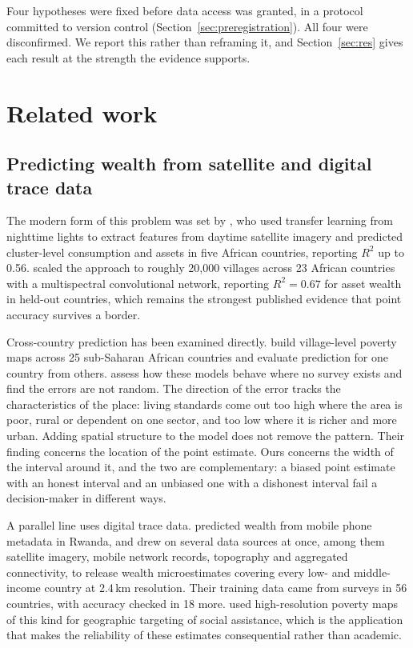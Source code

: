 \documentclass[11pt]{article}
\begin{document}
Four hypotheses were fixed before data access was granted, in a protocol
committed to version control (Section~\ref{sec:preregistration}). All four were
disconfirmed. We report this rather than reframing it, and Section~\ref{sec:res}
gives each result at the strength the evidence supports.

\section{Related work}

\subsection{Predicting wealth from satellite and digital trace data}

The modern form of this problem was set by \citet{jean2016}, who used transfer
learning from nighttime lights to extract features from daytime satellite
imagery and predicted cluster-level consumption and assets in five African
countries, reporting $R^2$ up to 0.56. \citet{yeh2020} scaled the approach to
roughly 20{,}000 villages across 23 African countries with a multispectral
convolutional network, reporting $R^2 = 0.67$ for asset wealth in held-out
countries, which remains the strongest published evidence that point accuracy
survives a border.

Cross-country prediction has been examined directly. \citet{lee2022} build
village-level poverty maps across 25 sub-Saharan African countries and evaluate
prediction for one country from others. \citet{corral2025} assess how these
models behave where no survey exists and find the errors are not random. The
direction of the error tracks the characteristics of the place: living standards
come out too high where the area is poor, rural or dependent on one sector, and
too low where it is richer and more urban. Adding spatial structure to the model
does not remove the pattern. Their finding
concerns the location of the point estimate. Ours concerns the width of the
interval around it, and the two are complementary: a biased point estimate with
an honest interval and an unbiased one with a dishonest interval fail a
decision-maker in different ways.

A parallel line uses digital trace data. \citet{blumenstock2015} predicted
wealth from mobile phone metadata in Rwanda, and \citet{chi2022} drew on
several data sources at once, among them satellite imagery, mobile network
records, topography and aggregated connectivity, to release wealth
microestimates covering every low- and middle-income country at 2.4\,km
resolution. Their training data came from surveys in 56 countries, with
accuracy checked in 18 more. \citet{smythe2022} used high-resolution poverty
maps of this kind for geographic targeting of social assistance, which is the
application that makes the reliability of these estimates consequential rather
than academic.
\end{document}
